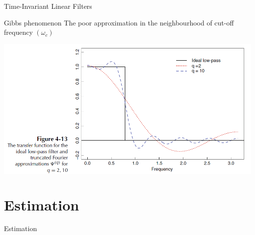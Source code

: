 \documentclass[11pt]{beamer}
\begin{document}
\begin{frame}{Time-Invariant Linear Filters \cite{brockwell2002introduction}}
\begin{exampleblock}{Gibbs phenomenon}
The poor approximation in the neighbourhood of cut-off frequency $(\omega_{c})$ 
\end{exampleblock}
    \begin{center}
     \includegraphics[width=\textwidth]{Pic/gibbs_ph.png}
    \end{center}
\end{frame}


\section{Estimation}
\begin{frame}
\begin{center}
\Huge
Estimation
\end{center}
\end{frame}
\end{document}

